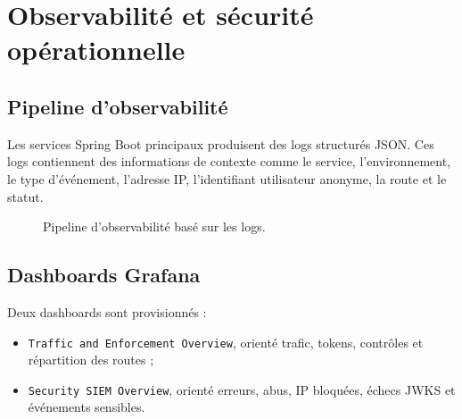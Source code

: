 ﻿\documentclass[12pt, a4paper]{report}
\begin{document}

\chapter{Observabilité et sécurité opérationnelle}

\section{Pipeline d'observabilité}

Les services Spring Boot principaux produisent des logs structurés JSON. Ces logs
contiennent des informations de contexte comme le service, l'environnement, le
type d'événement, l'adresse IP, l'identifiant utilisateur anonyme, la route et le
statut.

\begin{figure}[H]
\centering
{}
\caption{Pipeline d'observabilité basé sur les logs.}
\label{fig:observabilite}
\end{figure}

\section{Dashboards Grafana}

Deux dashboards sont provisionnés :

\begin{itemize}
  \item \texttt{Traffic and Enforcement Overview}, orienté trafic, tokens,
        contrôles et répartition des routes ;
  \item \texttt{Security SIEM Overview}, orienté erreurs, abus, IP bloquées,
        échecs JWKS et événements sensibles.
\end{itemize}
\end{document}
